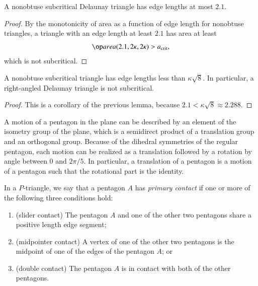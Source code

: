 \begin{lemma} 
  A nonobtuse subcritical Delaunay triangle has edge lengths at most $2.1$.
\end{lemma}

\begin{proof} By the monotonicity of area as a function of edge length
  for nonobtuse triangles, a triangle with an edge length at least
  $2.1$ has area at least
\[
\area(2.1,2\kappa,2\kappa) > \acrit,
\] %
which is not subcritical.
\end{proof}

\begin{lemma} 
  A nonobtuse subcritical triangle has edge lengths less than
  $\kappa\sqrt8$.  In particular, a right-angled Delaunay triangle is
  not subcritical.
\end{lemma}

\begin{proof}  
  This is a corollary of the previous lemma, because $2.1 <
  \kappa\sqrt8 \approx 2.288$.
\end{proof}

\begin{remark}
  A motion of a pentagon in the plane can be described by an element
  of the isometry group of the plane, which is a semidirect product of
  a translation group and an orthogonal group.  Because of the
  dihedral symmetries of the regular pentagon, each motion can be
  realized as a translation followed by a rotation by angle between
  $0$ and $2\pi/5$.  In particular, a translation of a pentagon is a
  motion of a pentagon such that the rotational part is the identity.
\end{remark}


\begin{definition}
In a $P$-triangle, we say that a pentagon $A$ has {\it primary
  contact} if one or more of the following three conditions hold:
\begin{enumerate}
\item (slider contact) The pentagon $A$ and one of the other two pentagons
   share a positive length edge segment;
\item (midpointer contact) A vertex of one of the other two pentagons
  is the midpoint of one of the edges of the pentagon $A$; or
\item (double contact) The pentagon $A$ is in contact with both of the
  other pentagons.
\end{enumerate}
\end{definition}

